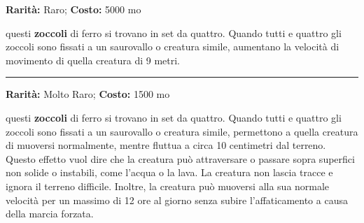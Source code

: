 \begin{multicols}{2}
\textbf{Rarità:} Raro; \textbf{Costo:} 5000 mo

questi \textbf{zoccoli} di ferro si trovano in set da quattro. Quando tutti e quattro gli zoccoli sono fissati a un saurovallo o creatura simile, aumentano la velocità di movimento di quella creatura di 9 metri.

\smallskip\noindent\rule{\linewidth}{2pt}  \hypertarget{ZoccolidelloZefiro}{}\medskip{}\noindent\label{ZoccolidelloZefiro}

\textbf{Rarità:} Molto Raro; \textbf{Costo:} 1500 mo

questi \textbf{zoccoli} di ferro si trovano in set da quattro. Quando tutti e quattro gli zoccoli sono fissati a un saurovallo o creatura simile, permettono a quella creatura di muoversi normalmente, mentre fluttua a circa 10 centimetri dal terreno. Questo effetto vuol dire che la creatura può attraversare o passare sopra superfici non solide o instabili, come l'acqua o la lava. La creatura non lascia tracce e ignora il terreno difficile. Inoltre, la creatura può muoversi alla sua normale velocità per un massimo di 12 ore al giorno senza subire l'affaticamento a causa della marcia forzata.

\end{multicols}








\pagebreak



